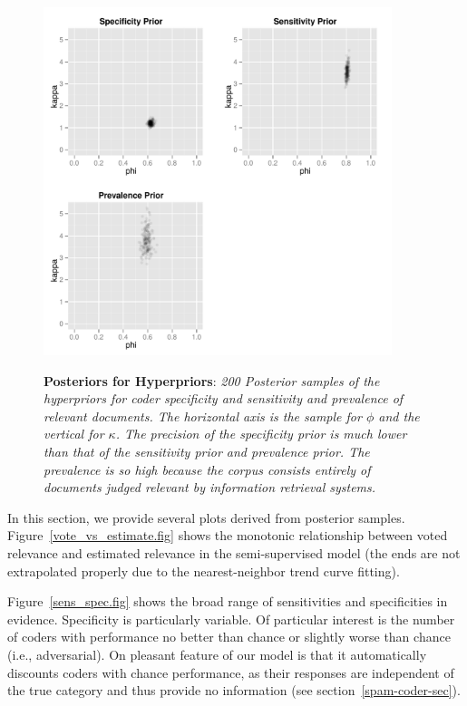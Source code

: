 \documentclass{article}
\begin{document}
%
\begin{figure}
\begin{center}
\includegraphics[height=4.0in]{img/hyperprior_post.pdf}
\parbox{5in}{\caption{\small {\bf Posteriors for Hyperpriors}: {\it  
200 Posterior samples of the hyperpriors for coder specificity
and sensitivity and prevalence of relevant documents.  The horizontal
axis is the sample for $\phi$ and the vertical for $\kappa$.  The
precision of the specificity prior is much lower than that of the
sensitivity prior and prevalence prior.  The prevalence is so high
because the corpus consists entirely of documents judged relevant
by information retrieval systems.}}}\label{hyper_post.fig}
\end{center}
\end{figure}
%


In this section, we provide several plots derived from posterior 
samples.  Figure~\ref{vote_vs_estimate.fig} shows the monotonic relationship
between voted relevance and estimated relevance in the semi-supervised
model (the ends are not extrapolated properly due to the
nearest-neighbor trend curve fitting).  

Figure~\ref{sens_spec.fig}
shows the broad range of sensitivities and specificities in evidence.
Specificity is particularly variable.  Of particular interest is the
number of coders with performance no better than chance or slightly
worse than chance (i.e., adversarial).  On pleasant feature of our
model is that it automatically discounts coders with chance
performance, as their responses are independent of the true category
and thus provide no information (see section~\ref{spam-coder-sec}).
\end{document}
